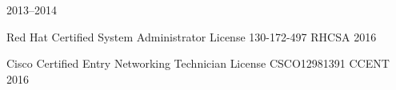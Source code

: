 

\begin{cvhonors}

    {2013--2014}


    \cvhonor
    {Red Hat Certified System Administrator}
    {License 130-172-497}
    {RHCSA}
    {2016}

  \cvhonor
    {Cisco Certified Entry Networking Technician}
    {License CSCO12981391}
    {CCENT}
    {2016}

\end{cvhonors}

